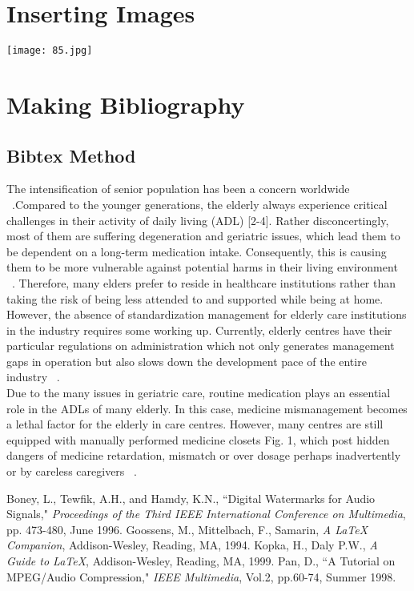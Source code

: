 \documentclass[12pt]{article}
\begin{document}
	\newpage
	\section{Inserting Images}
	
	\texttt{[image: 85.jpg]}
	\newpage
	
	\newpage
	\section{ Making Bibliography}
	
	\subsection{Bibtex Method}
	
	The intensification of senior population has been a concern worldwide ~\cite{Boney96}.Compared to the younger generations, the elderly always experience critical challenges in their activity of daily living (ADL) [2-4]. Rather disconcertingly, most of them are suffering degeneration and geriatric issues, which lead them to be dependent on a long-term medication intake. Consequently, this is causing them to be more vulnerable against potential harms in their living environment ~\cite{MG}.
	Therefore, many elders prefer to reside in healthcare institutions rather than taking the risk of being less attended to and supported while being at home.\\ However, the absence of standardization management for elderly care institutions in the industry requires some working up. Currently, elderly centres have their particular regulations on administration which not only generates management gaps in operation but also slows down the development pace of the entire industry ~\cite{HK}.\\
	Due to the many issues in geriatric care, routine medication plays an essential
	role in the ADLs of many elderly. In this case, medicine mismanagement becomes
	a lethal factor for the elderly in care centres. However, many centres are still
	equipped with manually performed medicine closets Fig. 1, which post hidden
	dangers of medicine retardation, mismatch or over dosage perhaps inadvertently or
	by careless caregivers ~\cite{Pan}. 
	
	\begin{thebibliography} {}
		
		 Boney, L., Tewfik, A.H., and Hamdy, K.N., ``Digital
		Watermarks for Audio Signals," \emph{Proceedings of the Third IEEE
			International Conference on Multimedia}, pp. 473-480, June 1996.
		 Goossens, M., Mittelbach, F., Samarin, \emph{A LaTeX
			Companion}, Addison-Wesley, Reading, MA, 1994.
		 Kopka, H., Daly P.W., \emph{A Guide to LaTeX},
		Addison-Wesley, Reading, MA, 1999.
		 Pan, D., ``A Tutorial on MPEG/Audio Compression," \emph{IEEE
			Multimedia}, Vol.2, pp.60-74, Summer 1998.
	\end{thebibliography}

\newpage



	
\end{document}
